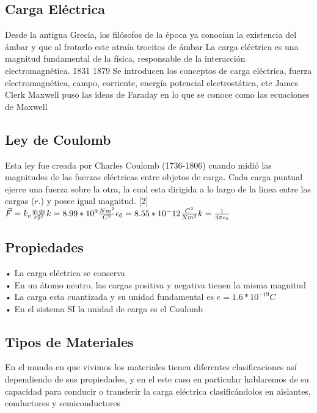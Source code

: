 \documentclass[14pt]{article}
\begin{document}
	\subsection{Carga Eléctrica}
	Desde la antigua Grecia, los filósofos de la época ya conocían la existencia del ámbar y que al frotarlo este atraía trocitos de ámbar
	La carga eléctrica es una magnitud fundamental de la física, responsable de la interacción electromagnética.
	1831
	1879 Se introducen los conceptos de carga eléctrica, fuerza
	electromagnética, campo, corriente, energía potencial electrostática, etc
	James Clerk Maxwell puso las ideas de Faraday en lo que se conoce como
	las ecuaciones de Maxwell
	
	\subsection{Ley de Coulomb}
	Esta ley fue creada por Charles Coulomb (1736-1806) cuando midió las magnitudes de las fuerzas eléctricas entre objetos de carga. Cada carga puntual ejerce una fuerza sobre la otra, la cual esta dirigida a lo largo de la linea entre las cargas ($r.$) y posee igual magnitud. [2]\\
	\begin{math}
		 \vec{F} = k_{e} \frac{q_{1}q_{2}}{r{2^2}} \\  
		 k = 8.99*10^9 \frac{Nm^2}{C^2} \\
		 \epsilon_{0} = 8.55*10^-12 \frac{C^2}{Nm^2} \\
		 k = \frac{1}{4 \pi \epsilon_{0}} \\
	\end{math}
	
		\subsection{Propiedades}
		• La carga eléctrica se conserva \\
		• En un átomo neutro, las cargas 
		positiva y negativa tienen la misma
		magnitud \\
		• La carga esta cuantizada y su
		unidad fundamental es
		$e = 1.6*10^{-19}C$ \\
		• En el sistema SI la unidad de
		carga es el Coulomb \\
	\subsection{Tipos de Materiales}
	En el mundo en que vivimos los materiales tienen diferentes clasificaciones así dependiendo de sus propiedades, y en el este caso en particular hablaremos de su capacidad para conducir o transferir la carga eléctrica clasificándolos en aislantes, conductores y semiconductores 
\end{document}
